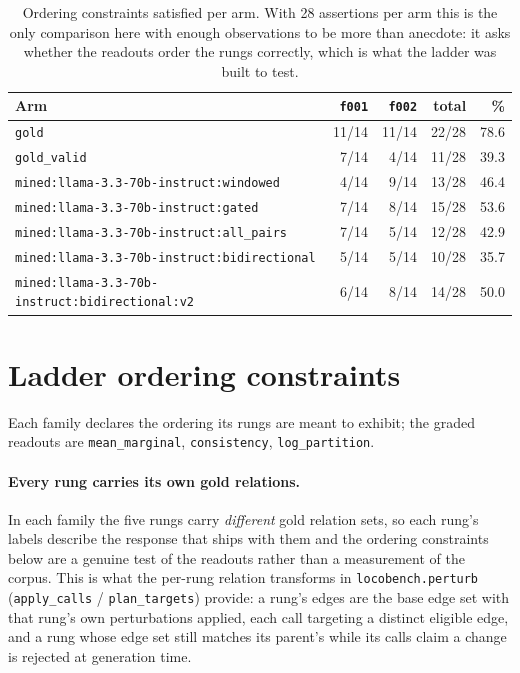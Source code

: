 \documentclass[11pt]{article}
\begin{document}
\begin{table}[htbp]
\centering
\small
\caption{Ordering constraints satisfied per arm. With 28 assertions per arm this is the only comparison here with enough observations to be more than anecdote: it asks whether the readouts order the rungs correctly, which is what the ladder was built to test.}
\label{tab:ladder-by-arm}
\begin{tabular}{lrrrr}
\toprule
Arm & \texttt{f001} & \texttt{f002} & total & \% \\
\midrule
\texttt{gold} & 11/14 & 11/14 & 22/28 & 78.6 \\
\texttt{gold\_valid} & 7/14 & 4/14 & 11/28 & 39.3 \\
\texttt{mined:llama-3.3-70b-instruct:windowed} & 4/14 & 9/14 & 13/28 & 46.4 \\
\texttt{mined:llama-3.3-70b-instruct:gated} & 7/14 & 8/14 & 15/28 & 53.6 \\
\texttt{mined:llama-3.3-70b-instruct:all\_pairs} & 7/14 & 5/14 & 12/28 & 42.9 \\
\texttt{mined:llama-3.3-70b-instruct:bidirectional} & 5/14 & 5/14 & 10/28 & 35.7 \\
\texttt{mined:llama-3.3-70b-instruct:bidirectional:v2} & 6/14 & 8/14 & 14/28 & 50.0 \\
\bottomrule
\end{tabular}
\end{table}

\section{Ladder ordering constraints}\label{sec:ladder}

Each family declares the ordering its rungs are meant to exhibit; the graded readouts are \texttt{mean\_marginal}, \texttt{consistency}, \texttt{log\_partition}.

\paragraph{Every rung carries its own gold relations.} In each family the five rungs carry \emph{different} gold relation sets, so each rung's labels describe the response that ships with them and the ordering constraints below are a genuine test of the readouts rather than a measurement of the corpus. This is what the per-rung relation transforms in \texttt{locobench.perturb} (\texttt{apply\_calls} / \texttt{plan\_targets}) provide: a rung's edges are the base edge set with that rung's own perturbations applied, each call targeting a distinct eligible edge, and a rung whose edge set still matches its parent's while its calls claim a change is rejected at generation time.
\end{document}
